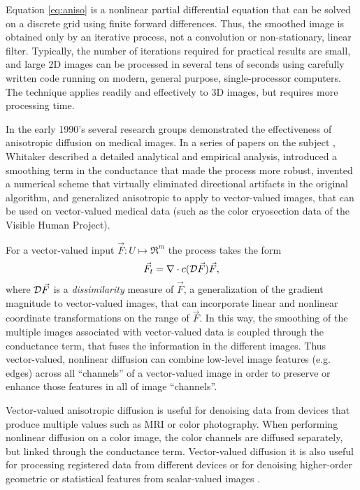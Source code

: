 Equation \ref{eq:aniso} is a nonlinear partial differential equation that can
be solved on a discrete grid using finite forward differences.  Thus, the
smoothed image is obtained only by an iterative process, not a convolution or
non-stationary, linear filter.  Typically, the number of iterations required
for practical results are small, and large 2D images can be processed in
several tens of seconds using carefully written code running on modern, general
purpose, single-processor computers.  The technique applies readily and
effectively to 3D images, but requires more processing time.

In the early 1990's several research groups \cite{Gerig1991,Whitaker1993d}
demonstrated the effectiveness of anisotropic diffusion on medical images.  In
a series of papers on the subject
\cite{Whitaker1993,Whitaker1993b,Whitaker1993c,Whitaker1993d,Whitaker-thesis,Whitaker1994},
Whitaker described a detailed analytical and empirical analysis, introduced a
smoothing term in the conductance that made the process more robust, invented
a numerical scheme that virtually eliminated directional artifacts in the
original algorithm, and generalized anisotropic to apply to vector-valued
images, that can be used on vector-valued medical data (such as the color
cryosection data of the Visible Human Project).

For a vector-valued input $\vec{F}:U \mapsto \Re^{m}$ the process takes the
form \begin{equation} \vec{F}_{t} = \nabla \cdot c({\cal D}\vec{F}) \vec{F},
\label{eq:vector_diff} \end{equation} where ${\cal D}\vec{F}$ is a {\em
dissimilarity} measure of $\vec{F}$, a generalization of the gradient magnitude
to vector-valued images, that can incorporate linear and nonlinear coordinate
transformations on the range of $\vec{F}$.  In this way, the smoothing of the
multiple images associated with vector-valued data is coupled through the
conductance term, that fuses the information in the different images.  Thus
vector-valued, nonlinear diffusion can combine low-level image features (e.g.
edges) across all ``channels'' of a vector-valued image in order to preserve or
enhance those features in all of image ``channels''.

Vector-valued anisotropic diffusion is useful for denoising data from devices
that produce multiple values such as MRI or color photography.  When performing
nonlinear diffusion on a color image, the color channels are diffused
separately, but linked through the conductance term. Vector-valued diffusion it
is also useful for processing registered data from different devices or for
denoising higher-order geometric or statistical features from scalar-valued
images \cite{Whitaker1994,Yoo1993}.

